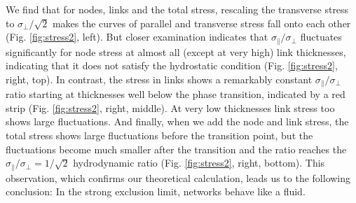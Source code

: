 \documentclass[nofootinbib,preprint,floatfix,endfloats]{revtex4} %
\begin{document}
We find that for nodes, links and the total stress, rescaling the transverse stress to $\sigma_\perp/\sqrt{2}$ makes the curves of parallel and transverse stress fall onto each other (Fig. \ref{fig:stress2}, left). 
But closer examination 
indicates that $\sigma_\parallel/\sigma_\perp$ fluctuates significantly for node stress at almost all (except at very high) link thicknesses, indicating that it does not satisfy the hydrostatic condition (Fig. \ref{fig:stress2}, right, top).
In contrast, the stress in links shows a remarkably constant  $\sigma_\parallel/\sigma_\perp$ ratio starting at thicknesses well below the phase transition, indicated by a red strip (Fig. \ref{fig:stress2}, right, middle). 
At very low thicknesses link stress too shows large fluctuations. 
And finally, when we add the node and link stress, the total stress shows large fluctuations before the transition point, but the fluctuations become much smaller after the transition and the ratio  reaches the $\sigma_\parallel/\sigma_\perp = 1/\sqrt{2}$ hydrodynamic ratio (Fig. \ref{fig:stress2}, right, bottom). This observation, which confirms our theoretical calculation, leads us to the following conclusion: In the strong exclusion limit, networks behave like a fluid. 
\end{document}
